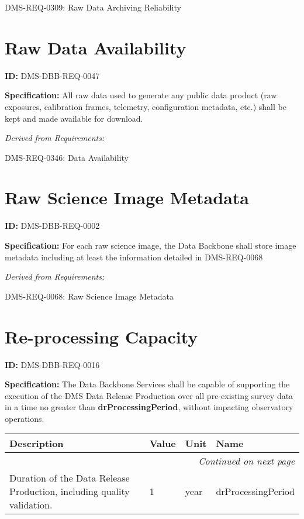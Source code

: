 \documentclass[SE,toc,lsstdraft]{lsstdoc}
\makeatletter
\newcommand{\paramname}[1]{\hspace{0pt}#1}
\newcommand{\unitname}[1]{\hspace{0pt}#1}
\newenvironment{parameters}[0]{%
\setlength\LTleft{0pt}
\setlength\LTright{\fill}
\begin{small}
\begin{longtable}[]{|p{0.49\textwidth}|l|p{0.6in}|p{1.70in}@{}|}

\hline \textbf{Description} & \textbf{Value} & \textbf{Unit} & \textbf{Name} \\ \hline
\endhead

\hline \multicolumn{4}{r}{\emph{Continued on next page}} \\
\endfoot

\hline\hline
\endlastfoot
}{%
\hline
\end{longtable}
\end{small}
}
\makeatother
\begin{document}
DMS-REQ-0309:
Raw Data Archiving Reliability \newline

\section{Raw Data Availability}

\label{DMS-DBB-REQ-0047}
\textbf{ID:} DMS-DBB-REQ-0047

\textbf{Specification:}
All raw data used to generate any public data product (raw exposures, calibration
frames, telemetry, configuration metadata, etc.) shall be kept and made available for
download.

\emph{Derived from Requirements:}

DMS-REQ-0346:
Data Availability \newline

\section{Raw Science Image Metadata}

\label{DMS-DBB-REQ-0002}
\textbf{ID:} DMS-DBB-REQ-0002

\textbf{Specification:}
For each raw science image, the Data Backbone shall store image metadata including at least the information detailed in DMS-REQ-0068

\emph{Derived from Requirements:}

DMS-REQ-0068:
Raw Science Image Metadata \newline

\section{Re-processing Capacity}

\label{DMS-DBB-REQ-0016}
\textbf{ID:} DMS-DBB-REQ-0016

\textbf{Specification:}
The Data Backbone Services shall be capable of supporting the execution of the DMS Data Release Production over all pre-existing survey data in a time no greater than \textbf{drProcessingPeriod}, without impacting observatory operations.

\begin{parameters}
Duration of the Data Release Production, including quality validation.
&
1
&
\unitname{%
year
}
&
\paramname{%
drProcessingPeriod
} \\\hline
\end{parameters}
\end{document}
